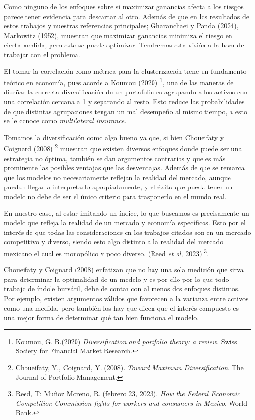 \documentclass[
]{article}
\begin{document}
Como ninguno de los enfoques sobre si maximizar ganancias afecta a los
riesgos parece tener evidencia para descartar al otro. Además de que en
los resultados de estos trabajos y nuestras referencias principales;
Gharanchaei y Panda (2024), Markowitz (1952), muestran que maximizar
ganancias minimiza el riesgo en cierta medida, pero esto se puede
optimizar. Tendremos esta visión a la hora de trabajar con el problema.

El tomar la correlación como métrica para la clusterización tiene un
fundamento teórico en economía, pues acorde a Koumou (2020)
\footnote{Koumou, G. B.(2020) \emph{Diversification and portfolio theory: a review}.
Swiss Society for Financial Market Research.}, una de las
maneras de diseñar la correcta diversificación de un portafolio es
agrupando a los activos con una correlación cercana a 1 y separando al
resto. Esto reduce las probabilidades de que distintas agrupaciones
tengan un mal desempeño al mismo tiempo, a esto se le conoce como 
\emph{multilateral insurance}.

Tomamos la diversificación como algo bueno ya que, si bien Choueifaty y
Coignard (2008) \footnote{Choueifaty, Y., Coignard, Y. (2008). 
\emph{Toward Maximum Diversification}. The Journal of Portfolio Management.} 
muestran que existen diversos enfoques donde puede ser
una estrategia no óptima, también se dan argumentos contrarios y que es
más prominente las posibles ventajas que las desventajas. Además de que
se remarca que los modelos no necesariamente reflejan la realidad del
mercado, aunque puedan llegar a interpretarlo apropiadamente, y el éxito
que pueda tener un modelo no debe de ser el único criterio para
trasponerlo en el mundo real.

En nuestro caso, al estar imitando un índice, lo que buscamos es
precisamente un modelo que refleja la realidad de un mercado y economía
específicos. Esto por el interés de que todas las consideraciones en los
trabajos citados son en un mercado competitivo y diverso, siendo esto
algo distinto a la realidad del mercado mexicano el cual es monopólico y
poco diverso. (Reed \emph{et al,} 2023)
\footnote{Reed, T; Muñoz Moreno, R. (febrero 23, 2023). 
\emph{How the Federal Economic Competition Commission fights for workers and consumers in Mexico}. World Bank.}.

Choueifaty y Coignard (2008) enfatizan que no hay una sola medición que
sirva para determinar la optimalidad de un modelo y es por ello por lo
que todo trabajo de índole bursátil, debe de contar con al menos dos
enfoques distintos. Por ejemplo, existen argumentos válidos que
favorecen a la varianza entre activos como una medida, pero también los
hay que dicen que el interés compuesto es una mejor forma de determinar
qué tan bien funciona el modelo.
\end{document}
